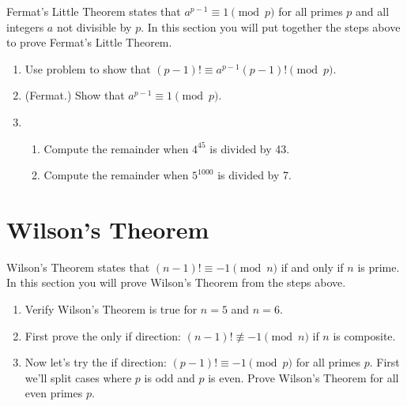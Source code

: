 \documentclass[11pt]{article}
\theoremstyle{definition}
\begin{document}
Fermat's Little Theorem states that $a^{p-1} \equiv 1 \pmod{p}$ for
all primes $p$ and all integers $a$ not divisible by $p$. In
this section you will put together the steps above to prove
Fermat's Little Theorem.

\begin{enumerate} \addtocounter{enumi}{\value{problem_count}}

\item \addtocounter{problem_count}{1}
Use problem  to show that $(p-1)! \equiv a^{p-1}(p-1)! \pmod{p}$.

\item \addtocounter{problem_count}{1}
(Fermat.) Show that $a^{p-1} \equiv 1 \pmod{p}$.

\item \addtocounter{problem_count}{1}
\begin{enumerate}
\item 
Compute the remainder when $4^{45}$ is divided by 43.

\item  
Compute the remainder when $5^{1000}$ is divided by 7.


\end{enumerate}
\end{enumerate}

\section{Wilson's Theorem}
Wilson's Theorem states that $(n - 1)! \equiv -1 \pmod{n}$ if and only if $n$ is prime. In this section you will prove Wilson's Theorem from the steps above.

\begin{enumerate} \addtocounter{enumi}{\value{problem_count}}

\item \addtocounter{problem_count}{1}
Verify Wilson's Theorem is true for $n = 5$ and $n = 6$.

\item \addtocounter{problem_count}{1}
First prove the only if direction:  $(n - 1)! \not\equiv -1 \pmod{n}$ if $n$ is composite.

\item \addtocounter{problem_count}{1}
Now let's try the if direction: $(p - 1)! \equiv -1 \pmod{p}$ for all primes $p$. First we'll split cases where $p$ is odd and $p$ is even. Prove Wilson's Theorem for all even primes $p$.

\end{enumerate}
\end{document}

